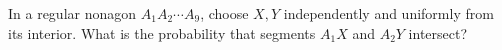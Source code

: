 In a regular nonagon $A_1A_2\cdots A_9$, choose $X,Y$ independently and uniformly from its interior. What is the probability that segments $A_1X$ and $A_2Y$ intersect?
